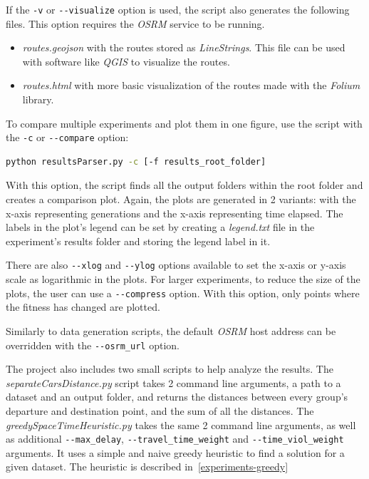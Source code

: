 If the \texttt{-v} or \texttt{-{}-visualize} option is used, the script also generates the following files. This option requires the \textit{OSRM} service to be running.

\begin{itemize}
    \setlength\itemsep{0pt}
    \item \textit{routes.geojson} with the routes stored as \textit{LineStrings}. This file can be used with software like \textit{QGIS} to visualize the routes.
    \item \textit{routes.html} with more basic visualization of the routes made with the \textit{Folium} library.
\end{itemize}

To compare multiple experiments and plot them in one figure, use the script with the \texttt{-c} or \texttt{-{}-compare} option:

\begin{lstlisting}[language=bash]
    python resultsParser.py -c [-f results_root_folder] 
\end{lstlisting}

With this option, the script finds all the output folders within the root folder and creates a comparison plot. Again, the plots are generated in 2 variants: with the x-axis representing generations and the x-axis representing time elapsed. The labels in the plot's legend can be set by creating a \textit{legend.txt} file in the experiment's results folder and storing the legend label in it.

There are also \texttt{-{}-xlog} and \texttt{-{}-ylog} options available to set the x-axis or y-axis scale as logarithmic in the plots. For larger experiments, to reduce the size of the plots, the user can use a \texttt{-{}-compress} option. With this option, only points where the fitness has changed are plotted.

Similarly to data generation scripts, the default \textit{OSRM} host address can be overridden with the \texttt{-{}-osrm\_url} option.

The project also includes two small scripts to help analyze the results. The \textit{separateCarsDistance.py} script takes 2 command line arguments, a path to a dataset and an output folder, and returns the distances between every group's departure and destination point, and the sum of all the distances. The \textit{greedySpaceTimeHeuristic.py} takes the same 2 command line arguments, as well as additional \texttt{-{}-max\_delay}, \texttt{-{}-travel\_time\_weight} and \texttt{-{}-time\_viol\_weight} arguments. It uses a simple and naive greedy heuristic to find a solution for a given dataset. The heuristic is described in~\ref{experiments-greedy}




